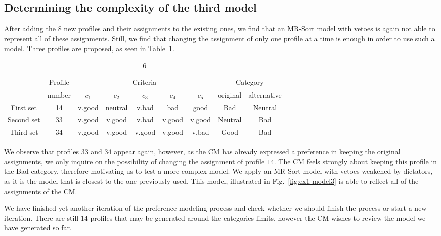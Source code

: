 \subsection{Determining the complexity of the third model}

After adding the $8$ new profiles and their assignments to the existing ones, we find that an MR-Sort model with vetoes is again not able to represent all of these assignments. Still, we find that changing the assignment of only one profile at a time is enough in order to use such a model. Three profiles are proposed, as seen in Table~\ref{tab:ex1-step6}.

\begin{table}
\caption{6}\label{tab:ex1-step6}
\small

\begin{tabular}{ccccccc|cc}
&Profile& \multicolumn{5}{c}{Criteria} & \multicolumn{2}{|c}{Category} \\
&number& $c_1$ & $c_2$ & $c_3$ & $c_4$ & $c_5$ & \multicolumn{1}{c}{original} & \multicolumn{1}{c}{alternative} \\\hline
\multirow{1}{*}{First set}&         14 &     v.good &    neutral &      v.bad &        bad &       good &  Bad & Neutral \\\hline
        
\multirow{1}{*}{Second set}&        33 &     v.good &     v.good &      v.bad &     v.good &     v.good &  Neutral & Bad \\\hline
         
\multirow{1}{*}{Third set}&         34 &     v.good &     v.good &     v.good &     v.good & v.bad & Good & Bad \\\hline
\end{tabular}
\end{table}

We observe that profiles $33$ and $34$ appear again, however, as the CM has already expressed a preference in keeping the original assignments, we only inquire on the possibility of changing the assignment of profile $14$. The CM feels strongly about keeping this profile in the Bad category, therefore motivating us to test a more complex model. We apply an MR-Sort model with vetoes weakened by dictators, as it is the model that is closest to the one previously used. This model, illustrated in Fig.~\ref{fig:ex1-model3} is able to reflect all of the assignments of the CM.



We have finished yet another iteration of the preference modeling process and check whether we should finish the process or start a new iteration. There are still $14$ profiles that may be generated around the categories limits, however the CM wishes to review the model we have generated so far.

